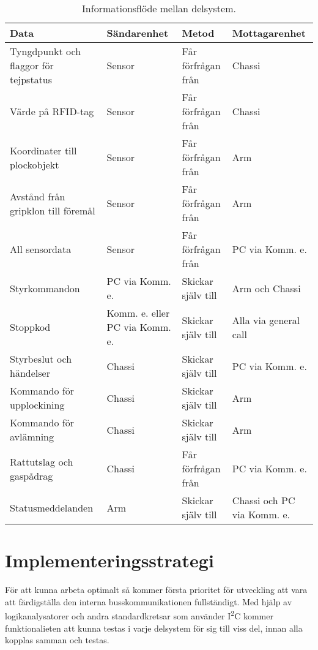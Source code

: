 \begin{table}[H]
	\centering
	\begin{tabularx}{\textwidth}{|X|X|X|X|}
		\hline
        \textbf{Data} & \textbf{Sändarenhet} & \textbf{Metod} & \textbf{Mottagarenhet} \\
        \hline
        Tyngdpunkt och flaggor för tejpstatus & Sensor & Får förfrågan från & Chassi \\
        \hline
        Värde på RFID-tag & Sensor & Får förfrågan från & Chassi \\
        \hline
        Koordinater till plockobjekt & Sensor & Får förfrågan från & Arm \\
        \hline
        Avstånd från gripklon till föremål & Sensor  & Får förfrågan från & Arm\\
        \hline
        All sensordata & Sensor & Får förfrågan från & PC via Komm. e. \\
        \hline
        Styrkommandon & PC via Komm. e. & Skickar själv till & Arm och Chassi\\
        \hline
        Stoppkod & Komm. e. eller PC via Komm. e. & Skickar själv till & Alla via general call\\
        \hline
        Styrbeslut och händelser & Chassi & Skickar själv till & PC via Komm. e. \\
        \hline
        Kommando för upplockining & Chassi & Skickar själv till & Arm \\
        \hline
        Kommando för avlämning & Chassi & Skickar själv till & Arm \\
        \hline
        Rattutslag och gaspådrag & Chassi & Får förfrågan från & PC via Komm. e. \\
        \hline
        Statusmeddelanden & Arm & Skickar själv till & Chassi och PC via Komm. e.\\
        \hline
	\end{tabularx}
	\caption{Informationsflöde mellan delsystem.}
	\label{tab:infflöde}
\end{table}
    

\section{Implementeringsstrategi}
För att kunna arbeta optimalt så kommer första prioritet för utveckling att vara att färdigställa den interna busskommunikationen fullständigt. Med hjälp av logikanalysatorer och andra standardkretsar som använder I\textsuperscript{2}C kommer funktionalieten att kunna testas i varje delsystem för sig till viss del, innan alla kopplas samman och testas. 

